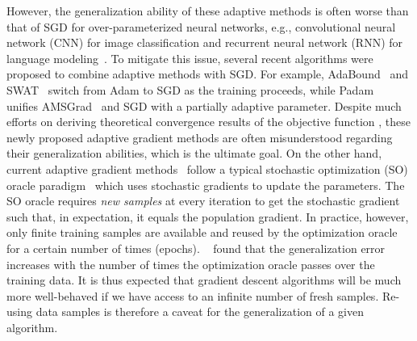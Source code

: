 \documentclass[11pt]{article}
\begin{document}
However, the generalization ability of these adaptive methods is often worse than that of SGD for over-parameterized neural networks, e.g., convolutional neural network (CNN) for image classification and recurrent neural network (RNN) for language modeling~\citep{wiro17}. 
To mitigate this issue, several recent algorithms were proposed to combine adaptive methods with SGD.
For example, AdaBound~\citep{luxi2019} and SWAT~\citep{keso2017} switch from Adam to SGD as the training proceeds, while Padam~\citep{chgu2018, zhta18} unifies AMSGrad~\citep{reka2018} and SGD with a partially adaptive parameter.  
Despite much efforts on deriving theoretical convergence results of the objective function \citep{zare18,wawu19, zosh2019, cheli2019}, these newly proposed adaptive gradient methods are often misunderstood regarding their generalization abilities, which is the ultimate goal.
On the other hand, current adaptive gradient methods~\citep{duha11,kiba15,tige12, reka2018, wawu19} follow a typical stochastic optimization (SO) oracle paradigm~\citep{romo51, ghla2013} which uses stochastic gradients to update the parameters. 
The SO oracle requires \emph{new samples} at every iteration to get the stochastic gradient such that, in expectation, it equals the population gradient. 
In practice, however, only finite training samples are available and reused by the optimization oracle for a certain number of times (\ie epochs). 
~\citep{hare2016} found that the generalization error increases with the number of times the optimization oracle passes over the training data. 
It is thus expected that gradient descent algorithms will be much more well-behaved if we have access to an infinite number of fresh samples. 
Re-using data samples is therefore a caveat for the generalization of a given algorithm.
\end{document}
